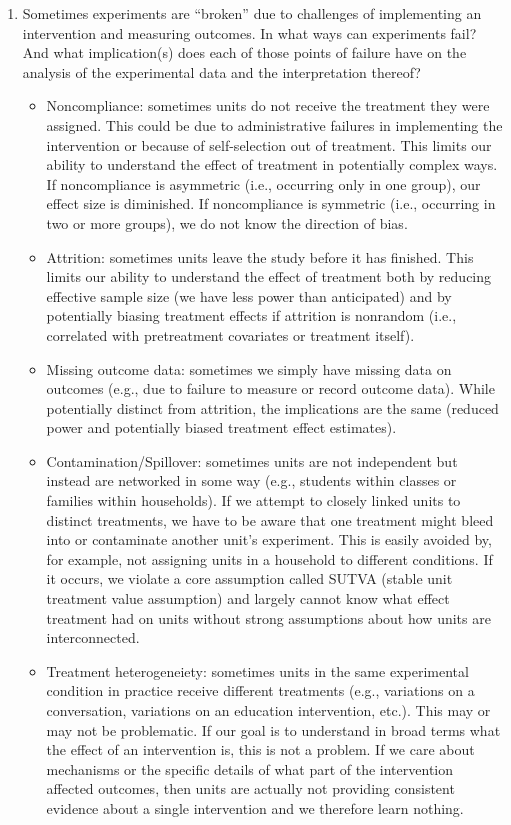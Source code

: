 \documentclass[a4paper,12pt]{exam}
\begin{document}
\begin{enumerate}
\begin{enumerate}
	\end{enumerate}

\item Sometimes experiments are ``broken'' due to challenges of implementing an intervention and measuring outcomes. In what ways can experiments fail? And what implication(s) does each of those points of failure have on the analysis of the experimental data and the interpretation thereof?

\begin{solution}

\begin{itemize}
\item Noncompliance: sometimes units do not receive the treatment they were assigned. This could be due to administrative failures in implementing the intervention or because of self-selection out of treatment. This limits our ability to understand the effect of treatment in potentially complex ways. If noncompliance is asymmetric (i.e., occurring only in one group), our effect size is diminished. If noncompliance is symmetric (i.e., occurring in two or more groups), we do not know the direction of bias.
\item Attrition: sometimes units leave the study before it has finished. This limits our ability to understand the effect of treatment both by reducing effective sample size (we have less power than anticipated) and by potentially biasing treatment effects if attrition is nonrandom (i.e., correlated with pretreatment covariates or treatment itself).
\item Missing outcome data: sometimes we simply have missing data on outcomes (e.g., due to failure to measure or record outcome data). While potentially distinct from attrition, the implications are the same (reduced power and potentially biased treatment effect estimates).
\item Contamination/Spillover: sometimes units are not independent but instead are networked in some way (e.g., students within classes or families within households). If we attempt to closely linked units to distinct treatments, we have to be aware that one treatment might bleed into or contaminate another unit's experiment. This is easily avoided by, for example, not assigning units in a household to different conditions. If it occurs, we violate a core assumption called SUTVA (stable unit treatment value assumption) and largely cannot know what effect treatment had on units without strong assumptions about how units are interconnected.
\item Treatment heterogeneiety: sometimes units in the same experimental condition in practice receive different treatments (e.g., variations on a conversation, variations on an education intervention, etc.). This may or may not be problematic. If our goal is to understand in broad terms what the effect of an intervention is, this is not a problem. If we care about mechanisms or the specific details of what part of the intervention affected outcomes, then units are actually not providing consistent evidence about a single intervention and we therefore learn nothing.
\end{itemize}


\end{solution}
\end{enumerate}
\end{document}
